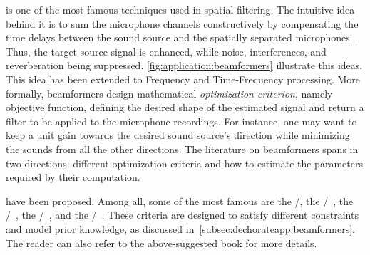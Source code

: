  is one of the most famous techniques used in spatial filtering.
The intuitive idea behind it is to sum the microphone channels constructively by compensating the time delays between the sound source and the spatially separated microphones~.
Thus, the target source signal is enhanced, while noise, interferences, and reverberation being suppressed.
\cref{fig:application:beamformers} illustrate this ideas.
This idea has been extended to Frequency and Time-Frequency processing.
More formally, beamformers design mathematical \textit{optimization criterion}, namely objective function, defining the desired shape of the estimated signal and return a filter to be applied to the microphone recordings.
For instance, one may want to keep a unit gain towards the desired sound source's direction while minimizing the sounds from all the other directions.
The literature on beamformers spans in two directions: different optimization criteria and how to estimate the parameters required by their computation.

 have been proposed.
Among all, some of the most famous are the \DStxt/, the \MVDRtxt/~, the \MaxSNRtxt/~, the \MaxSINRtxt/~, and the \LCMVtxt/~.
These criteria are designed to satisfy different constraints and model prior knowledge, as discussed in~\cref{subsec:dechorateapp:beamformers}.
The reader can also refer to the above-suggested book for more details.

